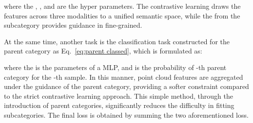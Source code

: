 \documentclass[sigconf]{acmart}
\begin{document}
where the , , and  are the hyper parameters. The contrastive learning draws the features across three modalities to a unified semantic space, while the  from the subcategory provides guidance in fine-grained. 

At the same time, another task is the classification task constructed for the parent category as Eq.~\ref{eq:parent classed}, which is formulated as:


where the  is the parameters of a MLP, and  is the probability of -th parent category for the -th sample. In this manner, point cloud features are aggregated under the guidance of the parent category, providing a softer constraint compared to the strict contrastive learning approach. This simple method, through the introduction of parent categories, significantly reduces the difficulty in fitting subcategories. The final loss is obtained by summing the two aforementioned loss. 
\end{document}

